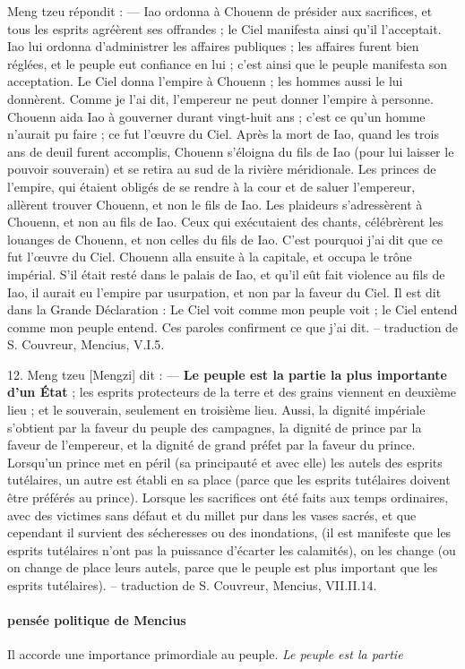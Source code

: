 \begin{singlequote}
Meng tzeu répondit :
—	Iao ordonna à Chouenn de présider aux sacrifices, et tous les esprits agréèrent ses offrandes ; le Ciel manifesta ainsi qu’il l’acceptait. Iao lui ordonna d’administrer les affaires publiques ; les affaires furent bien réglées, et le peuple eut confiance en lui ; c’est ainsi que le peuple manifesta son acceptation. Le Ciel donna l’empire à Chouenn ; les hommes aussi le lui donnèrent. Comme je l’ai dit, l’empereur ne peut donner l’empire à personne.
Chouenn aida Iao à gouverner durant vingt-huit ans ; c’est ce qu’un homme n’aurait pu faire ; ce fut l’œuvre du Ciel. Après la mort de Iao, quand les trois ans de deuil furent accomplis, Chouenn s’éloigna du fils de Iao (pour lui laisser le pouvoir souverain) et se retira au sud de la rivière méridionale. Les princes de l’empire, qui étaient obligés de se rendre à la cour et de saluer l’empereur, allèrent trouver Chouenn, et non le fils de Iao. Les plaideurs s’adressèrent à Chouenn, et non au fils de Iao. Ceux qui exécutaient des chants, célébrèrent les louanges de Chouenn, et non celles du fils de Iao. C’est pourquoi j’ai dit que ce fut l’œuvre du Ciel. Chouenn alla ensuite à la capitale, et occupa le trône impérial. S’il était resté dans le palais de Iao, et qu’il eût fait violence au fils de Iao, il aurait eu l’empire par usurpation, et non par la faveur du Ciel. Il est dit dans la Grande Déclaration :
Le Ciel voit comme mon peuple voit ; le Ciel entend comme mon peuple entend.
Ces paroles confirment ce que j’ai dit.
-- traduction de S. Couvreur, Mencius, V.I.5.
  
\end{singlequote}

\begin{singlequote}
    12.	Meng tzeu [Mengzi] dit :
—	\textbf{Le peuple est la partie la plus importante d’un État }; les esprits protecteurs de la terre et des grains viennent en deuxième lieu ; et le souverain, seulement en troisième lieu. Aussi, la dignité impériale s’obtient par la faveur du peuple des campagnes, la dignité de prince par la faveur de l’empereur, et la dignité de grand préfet par la faveur du prince. Lorsqu’un prince met en péril (sa principauté et avec elle) les autels des esprits tutélaires, un autre est établi en sa place (parce que les esprits tutélaires doivent être préférés au prince). Lorsque les sacrifices ont été faits aux temps ordinaires, avec des victimes sans défaut et du millet pur dans les vases sacrés, et que cependant il survient des sécheresses ou des inondations, (il est manifeste que les esprits tutélaires n’ont pas la puissance d’écarter les calamités), on les change (ou on change de place leurs autels, parce que le peuple est plus important que les esprits tutélaires).
-- traduction de S. Couvreur, Mencius, VII.II.14.

\end{singlequote}


\paragraph{pensée politique de Mencius} Il accorde une importance primordiale au peuple. \textit{Le peuple est la partie }